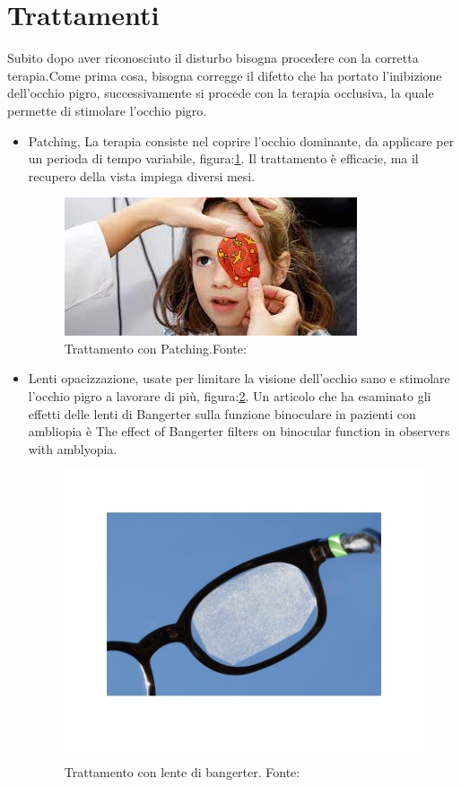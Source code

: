 \documentclass[
a4paper,
cleardoublepage=empty,
headings=twolinechapter,
numbers=autoenddot,
]{scrbook}
\begin{document}
	\section{Trattamenti}
	Subito dopo aver riconosciuto il disturbo bisogna procedere con la corretta terapia.Come prima cosa, bisogna corregge il difetto che ha portato l'inibizione dell'occhio pigro, successivamente si procede con la terapia occlusiva, la quale permette di stimolare l'occhio pigro.
	\begin{itemize}
		\item Patching\cite{patching}, La terapia consiste nel coprire l'occhio dominante, da applicare per un perioda di tempo variabile, figura:\ref{fig:patching}.
		Il trattamento è efficacie, ma il recupero della vista impiega diversi mesi.       	   
			\begin{figure}[h]
				\centering
				\includegraphics[width=0.5\linewidth]{image/patching}
				\caption{Trattamento con Patching.Fonte:\cite{Patching_image}}
				\label{fig:patching}
			\end{figure}	
	
		\item Lenti opacizzazione\cite{filtro}, usate per limitare la visione dell'occhio sano e stimolare l'occhio pigro a lavorare di più, figura:\ref{fig:penalizzazione-ottica}. Un articolo che ha esaminato gli effetti delle lenti di Bangerter sulla funzione binoculare in pazienti con ambliopia è The effect of Bangerter filters on binocular function in observers with amblyopia.
			\begin{figure}[H]
				\centering
				\includegraphics[width=0.6\linewidth]{image/penalizzazione ottica}
				\caption{Trattamento con lente di bangerter.
					Fonte:\cite{Bangerter_image}}
				\label{fig:penalizzazione-ottica}
			\end{figure}
	

\end{itemize}
\end{document}
